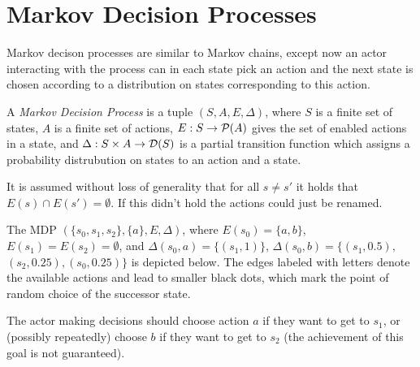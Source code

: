 \section{Markov Decision Processes}

Markov decison processes are similar to Markov chains, except now an
actor interacting with the process can in each state pick an action
and the next state is chosen according to a distribution on states
corresponding to this action.

\begin{definition}
A {\em Markov Decision Process} is a tuple $(S, A, E, \Delta)$, where
$S$ is a finite set of states,
$A$ is a finite set of actions,
$E : S \to \mathcal{P}(A)$ gives the set of enabled actions in a state,
and $\Delta : S \times A \to \mathcal{D}(S)$ is a partial transition
function which assigns a probability distrubution on states to an action
and a state.

It is assumed without loss of generality that for all $s \neq s'$ it
holds that $E(s) \cap E(s') = \emptyset$. If this didn't hold the
actions could just be renamed.
\end{definition}

\begin{example}
    \label{ex_mdp}
    The MDP $(\{s_0, s_1, s_2\}, \{a\}, E, \Delta)$,
    where
    $E(s_0) = \{a,b\}$, $E(s_1) = E(s_2) = \emptyset$,
    and $\Delta(s_0, a) = \{(s_1, 1)\}$,
    $\Delta(s_0, b) = \{(s_1, 0.5),$ $(s_2,0.25), (s_0,0.25)\}$
    is depicted below.
    The edges labeled with letters denote the available actions
    and lead to smaller black dots, which mark the point of random
    choice of the successor state.

    The actor making decisions should choose action $a$ if
    they want to get to $s_1$, or (possibly repeatedly) choose $b$ if
    they want to get to $s_2$ (the achievement of this goal is not
    guaranteed).

\hfill \break
\centering
{}

\end{example}

